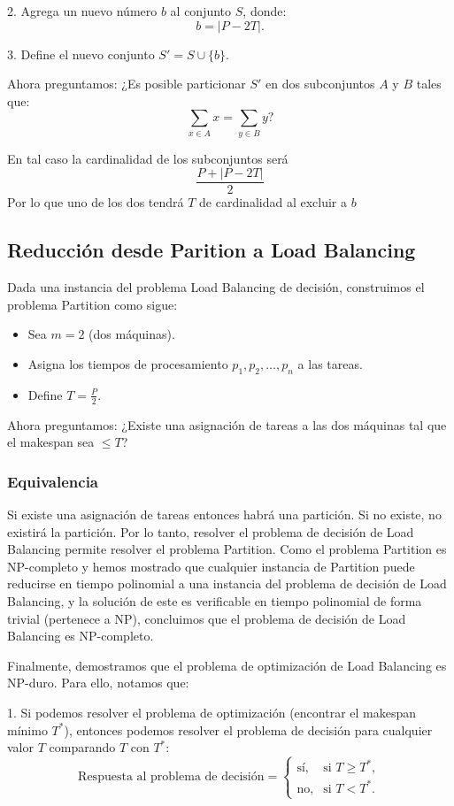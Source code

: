 \documentclass{report}
\begin{document}
	2. Agrega un nuevo número $ b $ al conjunto $ S $, donde:
	\[
	b = |P - 2T|.
	\]
	
	3. Define el nuevo conjunto $ S' = S \cup \{b\} $.
	
	Ahora preguntamos: ¿Es posible particionar $ S' $ en dos subconjuntos $ A $ y $ B $ tales que:
	\[
	\sum_{x \in A} x = \sum_{y \in B} y?
	\]
	
	En tal caso la cardinalidad de los subconjuntos será $$\frac{P + |P - 2T|}{2}$$ Por lo que uno de los dos tendrá $T$ de cardinalidad al excluir a $b$
	
	
	
	
	\subsection*{Reducción desde Parition a Load Balancing}
	Dada una instancia del problema Load Balancing de decisión, construimos el problema Partition como sigue:
	\begin{itemize}
		\item Sea $ m = 2 $ (dos máquinas).
		\item Asigna los tiempos de procesamiento $ p_1, p_2, \dots, p_n $ a las tareas.
		\item Define $ T = \frac{P}{2} $.
	\end{itemize}
	
	Ahora preguntamos: ¿Existe una asignación de tareas a las dos máquinas tal que el makespan sea $ \leq T $?
	
	\subsubsection*{Equivalencia}
	Si existe una asignación de tareas entonces habrá una partición. Si no existe, no existirá la partición. Por lo tanto, resolver el problema de decisión de Load Balancing permite resolver el problema Partition.
	Como el problema Partition es NP-completo y hemos mostrado que cualquier instancia de Partition puede reducirse en tiempo polinomial a una instancia del problema de decisión de Load Balancing, y la solución de este es verificable en tiempo polinomial de forma trivial (pertenece a NP), concluimos que el problema de decisión de Load Balancing es NP-completo.
	
	
	Finalmente, demostramos que el problema de optimización de Load Balancing es NP-duro. Para ello, notamos que:
	
	1. Si podemos resolver el problema de optimización (encontrar el makespan mínimo $ T^* $), entonces podemos resolver el problema de decisión para cualquier valor $ T $ comparando $ T $ con $ T^* $:
	\[
	\text{Respuesta al problema de decisión} =
	\begin{cases}
		\text{sí}, & \text{si } T \geq T^*, \\
		\text{no}, & \text{si } T < T^*.
	\end{cases}
	\]
	
\end{document}

